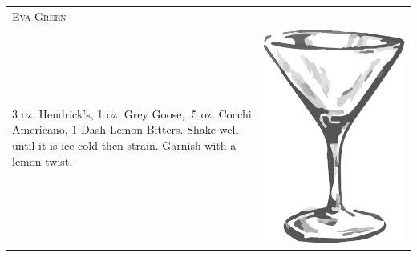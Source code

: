 \documentclass{article}
\begin{document}
\begin{tabular}{p{2in} p{0.5in}}
\multicolumn{2}{p{3in}}{\centering\Huge\textsc{Eva Green}}\\ 
  \vspace{-0.1in}3 oz. Hendrick's, 1 oz. Grey Goose, .5 oz. Cocchi Americano, 1 Dash Lemon Bitters. Shake well until it is ice-cold then strain. Garnish with a lemon twist. &
  \vspace{-0.1in} \includegraphics{goblet.png}
\end{tabular}
\end{document}
